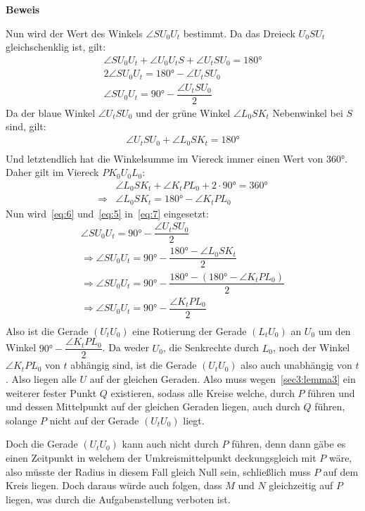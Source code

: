 \documentclass[10pt, a4paper]{amsart}
\makeatletter
\renewcommand\proofname{Beweis}
\renewenvironment{proof}[1][\proofname]{\par
\pushQED{\qed}%
\normalfont \topsep6\p@\@plus6\p@\relax
\trivlist
\item\relax
{\bfseries#1}\hspace\labelsep\ignorespaces
}{%
\popQED\endtrivlist\@endpefalse
}
\makeatother
\begin{document}
\begin{proof}
  Nun wird der Wert des Winkels $\angle SU_0U_t$ bestimmt. Da das Dreieck
  $U_0SU_t$ gleichschenklig ist, gilt:
  \begin{equation}
    \label{eq:7}
    \begin{split}
      \angle SU_0U_t +\angle U_0U_tS + \angle U_tSU_0 = 180°\\
      2\angle SU_0U_t = 180° - \angle U_tSU_0\\
      \angle SU_0U_t = 90° - \dfrac{\angle U_tSU_0}{2}
    \end{split}
  \end{equation}
  Da der blaue Winkel $\angle U_tSU_0$ und der grüne Winkel $\angle L_0SK_t$
  Nebenwinkel bei $S$ sind, gilt:
  \begin{equation}
    \label{eq:5}
    \begin{split}
      \angle U_tSU_0 + \angle L_0SK_t = 180°\\
    \end{split}
  \end{equation}
  Und letztendlich hat die Winkelsumme im Viereck immer einen Wert von $360°$. Daher gilt im
  Viereck $PK_0U_0L_0$:
  \begin{equation}
    \label{eq:6}
    \begin{split}
      &\angle L_0SK_t + \angle K_tPL_0 + 2\cdot 90° = 360°\\
      \Rightarrow &\angle L_0SK_t= 180° - \angle K_tPL_0
    \end{split}
  \end{equation}
  Nun wird~\eqref{eq:6} und~\eqref{eq:5} in~\eqref{eq:7} eingesetzt:
  \begin{align*}
    \angle SU_0U_t = 90° -\dfrac{\angle U_tSU_0}{2}\\
    \Rightarrow \angle SU_0U_t = 90° -\dfrac{180°-\angle L_0SK_t}{2}\\
    \Rightarrow \angle SU_0U_t = 90° -\dfrac{180°-(180° - \angle K_tPL_0)}{2}\\
    \Rightarrow \angle SU_0U_t = 90° -\dfrac{\angle K_tPL_0}{2}\\
  \end{align*}
  Also ist die Gerade $(U_tU_0)$ eine Rotierung der Gerade $(L_tU_0)$ an $U_0$ um
  den Winkel $90° -\dfrac{\angle K_tPL_0}{2}$. Da weder $U_0$, die Senkrechte durch $L_0$, noch der Winkel $\angle K_tPL_0$
  von $t$ abhängig sind, ist die Gerade $(U_tU_0)$ also auch unabhängig von $t$.
  Also liegen alle $U$ auf der gleichen Geraden. Also muss
  wegen~\autoref{sec3:lemma3} ein weiterer fester Punkt
  $Q$ existieren, sodass alle Kreise welche, durch $P$ führen und und dessen
  Mittelpunkt auf der gleichen Geraden liegen, auch durch $Q$ führen, solange
  $P$ nicht auf der Gerade $(U_tU_0)$ liegt.

  Doch die Gerade $(U_tU_0)$ kann auch nicht durch $P$ führen, denn dann gäbe es
  einen Zeitpunkt in welchem der Umkreismittelpunkt deckungsgleich mit $P$ wäre,
  also müsste der Radius in diesem Fall gleich Null sein, schließlich muss $P$
  auf dem Kreis liegen. Doch daraus würde auch folgen, dass $M$ und $N$
  gleichzeitig auf $P$ liegen, was durch die Aufgabenstellung verboten ist.
\end{proof}
\end{document}
